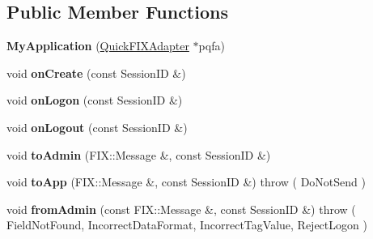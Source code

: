 \subsection*{Public Member Functions}
\begin{DoxyCompactItemize}
\item 
\hypertarget{classMetal_1_1QuickFIX_1_1MyApplication_ac015be7d9bb1677acda6fa464ce0f8ea}{}{\bfseries My\+Application} (\hyperlink{classMetal_1_1QuickFIX_1_1QuickFIXAdapter}{Quick\+F\+I\+X\+Adapter} $\ast$pqfa)\label{classMetal_1_1QuickFIX_1_1MyApplication_ac015be7d9bb1677acda6fa464ce0f8ea}

\item 
\hypertarget{classMetal_1_1QuickFIX_1_1MyApplication_a3f94210c4e0cbe060de70f7a875195c0}{}void {\bfseries on\+Create} (const Session\+I\+D \&)\label{classMetal_1_1QuickFIX_1_1MyApplication_a3f94210c4e0cbe060de70f7a875195c0}

\item 
\hypertarget{classMetal_1_1QuickFIX_1_1MyApplication_a8dd2c71b6ec276e4f3da25d3b58710b8}{}void {\bfseries on\+Logon} (const Session\+I\+D \&)\label{classMetal_1_1QuickFIX_1_1MyApplication_a8dd2c71b6ec276e4f3da25d3b58710b8}

\item 
\hypertarget{classMetal_1_1QuickFIX_1_1MyApplication_ab5519b36c6fa527fd482bfb6864bad44}{}void {\bfseries on\+Logout} (const Session\+I\+D \&)\label{classMetal_1_1QuickFIX_1_1MyApplication_ab5519b36c6fa527fd482bfb6864bad44}

\item 
\hypertarget{classMetal_1_1QuickFIX_1_1MyApplication_aa884521d47f50ff8c66c4ccd1409e1d6}{}void {\bfseries to\+Admin} (F\+I\+X\+::\+Message \&, const Session\+I\+D \&)\label{classMetal_1_1QuickFIX_1_1MyApplication_aa884521d47f50ff8c66c4ccd1409e1d6}

\item 
\hypertarget{classMetal_1_1QuickFIX_1_1MyApplication_af32204a063c0a11009652626c86b24d0}{}void {\bfseries to\+App} (F\+I\+X\+::\+Message \&, const Session\+I\+D \&)  throw ( Do\+Not\+Send )\label{classMetal_1_1QuickFIX_1_1MyApplication_af32204a063c0a11009652626c86b24d0}

\item 
\hypertarget{classMetal_1_1QuickFIX_1_1MyApplication_a4805e0aa8bc992043a2e3a0a4f818221}{}void {\bfseries from\+Admin} (const F\+I\+X\+::\+Message \&, const Session\+I\+D \&)  throw ( Field\+Not\+Found, Incorrect\+Data\+Format, Incorrect\+Tag\+Value, Reject\+Logon )\label{classMetal_1_1QuickFIX_1_1MyApplication_a4805e0aa8bc992043a2e3a0a4f818221}


\end{DoxyCompactItemize}

